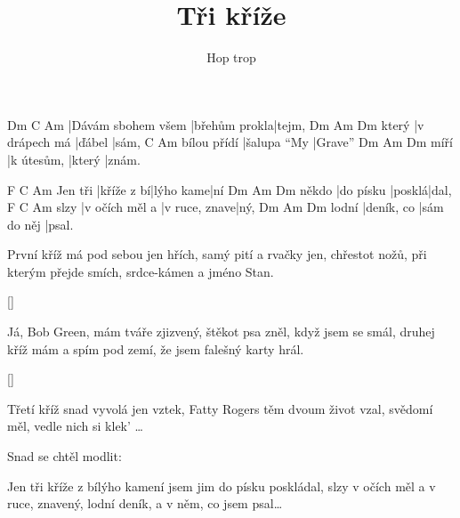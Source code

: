 \documentclass{song}
\title{Tři kříže}
\author{Hop trop}
\begin{document}
\strophe
Dm                 C             Am
|Dávám sbohem všem |břehům prokla|tejm,
      Dm            Am     Dm
který |v drápech má |ďábel |sám,
            C            Am
bílou přídí |šalupa ``My |Grave''
     Dm         Am     Dm
míří |k útesům, |který |znám.
\endstrophe

        F          C         Am
Jen tři |kříže z bí|lýho kame|ní
      Dm        Am     Dm
někdo |do písku |posklá|dal,
     F              C             Am
slzy |v očích měl a |v ruce, znave|ný,
      Dm         Am          Dm
lodní |deník, co |sám do něj |psal.
\endstrophe

\strophe*
První kříž má pod sebou jen hřích,
samý pití a rvačky jen,
chřestot nožů, při kterým přejde smích,
srdce-kámen a jméno Stan.
\endstrophe

\ref{}

\strophe*
Já, Bob Green, mám tváře zjizvený,
štěkot psa zněl, když jsem se smál,
druhej kříž mám a spím pod zemí,
že jsem falešný karty hrál.
\endstrophe

\ref{}

\strophe*
Třetí kříž snad vyvolá jen vztek,
Fatty Rogers těm dvoum život vzal,
svědomí měl, vedle nich si klek' \ldots
\endstrophe

\begin{recitative}
Snad se chtěl modlit:
\end{recitative}

Jen tři kříže z bílýho kamení
jsem jim do písku poskládal,
slzy v očích měl a v ruce, znavený,
lodní deník, a v něm, co jsem psal\ldots
\endstrophe
\end{document}
